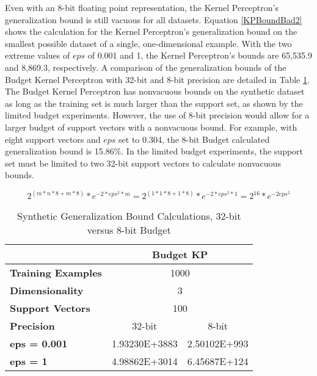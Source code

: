 Even with an 8-bit floating point representation, the Kernel Perceptron's generalization bound is still vacuous for all datasets. Equation \ref{KPBoundBad2} shows the calculation for the Kernel Perceptron's generalization bound on the smallest possible dataset of a single, one-dimensional example. With the two extreme values of $\mathit{eps}$ of 0.001 and 1, the Kernel Perceptron's bounds are 65,535.9 and 8,869.3, respectively. A comparison of the generalization bounds of the Budget Kernel Perceptron with 32-bit and 8-bit precision are detailed in Table \ref{tab:syntheticgencalc8}. The Budget Kernel Perceptron has nonvacuous bounds on the synthetic dataset as long as the training set is much larger than the support set, as shown by the limited budget experiments. However, the use of 8-bit precision would allow for a larger budget of support vectors with a nonvacuous bound. For example, with eight support vectors and $\mathit{eps}$ set to 0.304, the 8-bit Budget calculated generalization bound is 15.86\%. In the limited budget experiments, the support set must be limited to two 32-bit support vectors to calculate nonvacuous bounds.

\begin{equation} \label{KPBoundBad2}
 2^{(m*n*8 + m*8)} * e^{-2*eps^{2}*m} = 2^{(1*1*8 + 1*8)} * e^{-2*eps^{2}*1} = 2^{16}*e^{-2eps^{2}}
\end{equation}

\begin{table}[p]
 \begin{center}
  \caption{Synthetic Generalization Bound Calculations, 32-bit versus 8-bit Budget}
  \label{tab:syntheticgencalc8}
  \begin{tabular}{l|c|c}
  \textbf{ } & \multicolumn{2}{c}{\textbf{Budget KP}} \\\hline
  \textbf{Training Examples} & \multicolumn{2}{|c}{1000}\\
  \textbf{Dimensionality} & \multicolumn{2}{|c}{3}\\
  \textbf{Support Vectors} & \multicolumn{2}{|c}{100}\\\hline
  \textbf{Precision} & 32-bit & 8-bit\\
  \textbf{eps = 0.001} & 1.93230E+3883 & 2.50102E+993\\
  \textbf{eps = 1} & 4.98862E+3014 & 6.45687E+124\\
  \end{tabular}
 \end{center}
\end{table}

